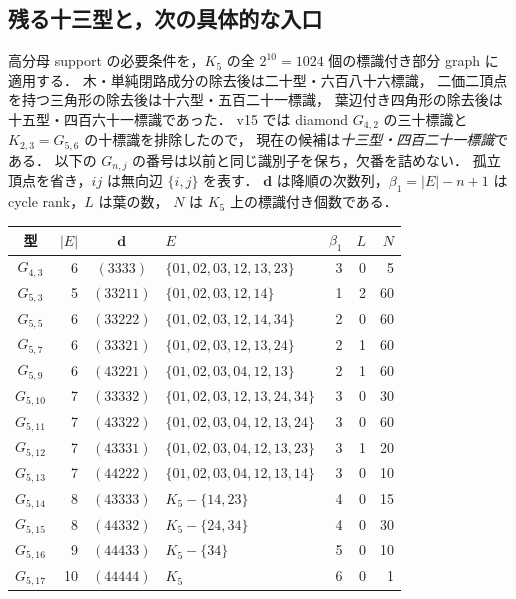 \subsection{残る十三型と，次の具体的な入口}
\label{ns15:support-agenda}

高分母 support の必要条件を，$K_5$ の全 $2^{10}=1024$ 個の標識付き部分 graph に適用する．
木・単純閉路成分の除去後は二十型・六百八十六標識，
二価二頂点を持つ三角形の除去後は十六型・五百二十一標識，
葉辺付き四角形の除去後は十五型・四百六十一標識であった．
v15 では diamond $G_{4,2}$ の三十標識と $K_{2,3}=G_{5,6}$ の十標識を排除したので，
現在の候補は\emph{十三型・四百二十一標識}である．
以下の $G_{n,j}$ の番号は以前と同じ識別子を保ち，欠番を詰めない．
孤立頂点を省き，$ij$ は無向辺 $\{i,j\}$ を表す．
$\mathbf d$ は降順の次数列，$\beta_1=|E|-n+1$ は cycle rank，$L$ は葉の数，
$N$ は $K_5$ 上の標識付き個数である．

\begin{center}
\footnotesize
\setlength{\tabcolsep}{3pt}
\begin{tabular}{crclrrr}
型 & $|E|$ & $\mathbf d$ & $E$ & $\beta_1$ & $L$ & $N$\\\hline
$G_{4,3}$ & 6 & $(3333)$ & $\{01,02,03,12,13,23\}$ & 3 & 0 & 5 \\
$G_{5,3}$ & 5 & $(33211)$ & $\{01,02,03,12,14\}$ & 1 & 2 & 60 \\
$G_{5,5}$ & 6 & $(33222)$ & $\{01,02,03,12,14,34\}$ & 2 & 0 & 60 \\
$G_{5,7}$ & 6 & $(33321)$ & $\{01,02,03,12,13,24\}$ & 2 & 1 & 60 \\
$G_{5,9}$ & 6 & $(43221)$ & $\{01,02,03,04,12,13\}$ & 2 & 1 & 60 \\
$G_{5,10}$ & 7 & $(33332)$ & $\{01,02,03,12,13,24,34\}$ & 3 & 0 & 30 \\
$G_{5,11}$ & 7 & $(43322)$ & $\{01,02,03,04,12,13,24\}$ & 3 & 0 & 60 \\
$G_{5,12}$ & 7 & $(43331)$ & $\{01,02,03,04,12,13,23\}$ & 3 & 1 & 20 \\
$G_{5,13}$ & 7 & $(44222)$ & $\{01,02,03,04,12,13,14\}$ & 3 & 0 & 10 \\
$G_{5,14}$ & 8 & $(43333)$ & $K_5-\{14,23\}$ & 4 & 0 & 15 \\
$G_{5,15}$ & 8 & $(44332)$ & $K_5-\{24,34\}$ & 4 & 0 & 30 \\
$G_{5,16}$ & 9 & $(44433)$ & $K_5-\{34\}$ & 5 & 0 & 10 \\
$G_{5,17}$ & 10 & $(44444)$ & $K_5$ & 6 & 0 & 1 \\
\end{tabular}
\end{center}


